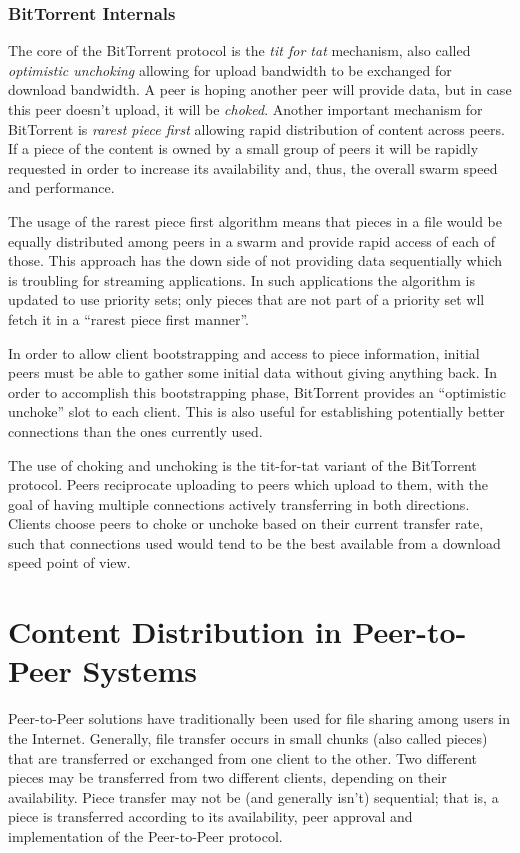 \subsubsection{BitTorrent Internals}

The core of the BitTorrent protocol is the \textit{tit for tat} mechanism,
also called \textit{optimistic unchoking} allowing for upload bandwidth to be
exchanged for download bandwidth. A peer is hoping another peer will provide
data, but in case this peer doesn't upload, it will be \textit{choked}.
Another important mechanism for BitTorrent is \textit{rarest piece first}
allowing rapid distribution of content across peers. If a piece of the content
is owned by a small group of peers it will be rapidly requested in order to
increase its availability and, thus, the overall swarm speed and performance.

The usage of the rarest piece first algorithm means that pieces in a file
would be equally distributed among peers in a swarm and provide rapid access
of each of those. This approach has the down side of not providing data
sequentially which is troubling for streaming applications. In such
applications the algorithm is updated to use priority sets; only pieces
that are not part of a priority set wll fetch it in a ``rarest piece first
manner''.

In order to allow client bootstrapping and access to piece information,
initial peers must be able to gather some initial data without giving anything
back. In order to accomplish this bootstrapping phase, BitTorrent provides an
``optimistic unchoke'' slot to each client. This is also useful for
establishing potentially better connections than the ones currently used.

The use of choking and unchoking is the tit-for-tat variant of the BitTorrent
protocol. Peers reciprocate uploading to peers which upload to them, with the
goal of having multiple connections actively transferring in both directions.
Clients choose peers to choke or unchoke based on their current transfer rate,
such that connections used would tend to be the best available from a download
speed point of view.

\section{Content Distribution in Peer-to-Peer Systems}
\label{sec:p2p-systems:streaming}

Peer-to-Peer solutions have traditionally been used for file sharing among
users in the Internet. Generally, file transfer occurs in small chunks (also
called pieces) that are transferred or exchanged from one client to the other.
Two different pieces may be transferred from two different clients, depending
on their availability. Piece transfer may not be (and generally isn't)
sequential; that is, a piece is transferred according to its availability,
peer approval and implementation of the Peer-to-Peer protocol.

